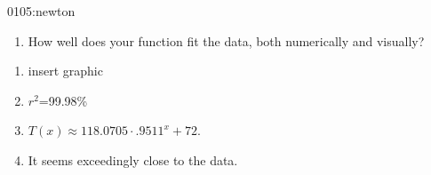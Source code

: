 \begin{defproblem}{0105:newton}
\begin{onlyproblem}
\begin{enumerate}
\item How well does your function fit the data, both numerically and visually?
\end{enumerate}
\end{onlyproblem}
\begin{onlysolution}
\begin{enumerate}
\item insert graphic
\item $r^2$=99.98\%
\item $T(x)\approx118.0705\cdot .9511^x+72$. 
\item It seems exceedingly close to the data.
\end{enumerate}
\end{onlysolution}
\end{defproblem}



\endinput
